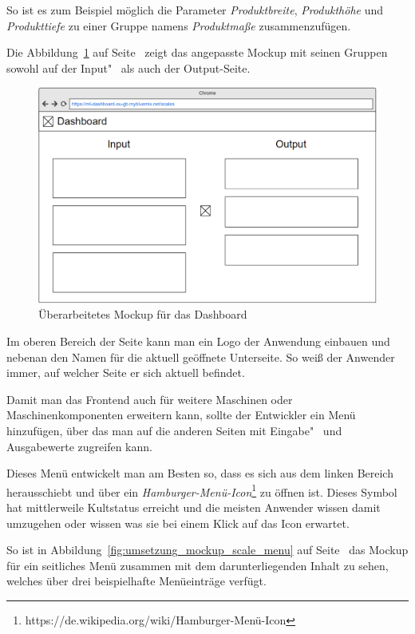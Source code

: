 So ist es zum Beispiel möglich die Parameter \textit{Produktbreite}, \textit{Produkthöhe} und \textit{Produkttiefe} zu
einer Gruppe namens \textit{Produktmaße} zusammenzufügen.

Die Abbildung~\ref{fig:umsetzung_mockup_scale_2} auf Seite~\pageref{fig:umsetzung_mockup_scale_2} zeigt das angepasste
Mockup mit seinen Gruppen sowohl auf der Input"~ als auch der Output-Seite.

\begin{figure}[h]
    \centering
    \includegraphics[width=\textwidth]{images/kapitel_4/mockup_scale_2.png}
    \caption{Überarbeitetes Mockup für das Dashboard}
    \label{fig:umsetzung_mockup_scale_2}
\end{figure}

Im oberen Bereich der Seite kann man ein Logo der Anwendung einbauen und nebenan den Namen für die aktuell geöffnete
Unterseite. So weiß der Anwender immer, auf welcher Seite er sich aktuell befindet.

Damit man das Frontend auch für weitere Maschinen oder Maschinenkomponenten erweitern kann, sollte der Entwickler ein
Menü hinzufügen, über das man auf die anderen Seiten mit Eingabe"~ und Ausgabewerte zugreifen kann.

Dieses Menü entwickelt man am Besten so, dass es sich aus dem linken Bereich herausschiebt und über ein
\textit{Hamburger-Menü-Icon}\footnote{https://de.wikipedia.org/wiki/Hamburger-Menü-Icon} zu öffnen ist. Dieses Symbol
hat mittlerweile Kultstatus erreicht und die meisten Anwender wissen damit umzugehen oder wissen was sie bei einem Klick
auf das Icon erwartet.

So ist in Abbildung~\ref{fig:umsetzung_mockup_scale_menu} auf Seite~\pageref{fig:umsetzung_mockup_scale_menu} das Mockup
für ein seitliches Menü zusammen mit dem darunterliegenden Inhalt zu sehen, welches über drei beispielhafte Menüeinträge
verfügt.

